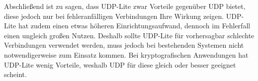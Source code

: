 \documentclass{template}
\begin{document}
Abschließend ist zu sagen, dass UDP-Lite zwar Vorteile gegenüber UDP bietet,
diese jedoch nur bei fehleranfälligen Verbindungen Ihre Wirkung zeigen.
UDP-Lite hat zudem einen etwas höheren Einrichtungsaufwand,
dennoch im Fehlerfall einen ungleich großen Nutzen.
Deshalb sollte UDP-Lite für vorhersagbar schlechte Verbindungen verwendet werden,
muss jedoch bei bestehenden Systemen nicht notwendigerweise zum Einsatz kommen.
Bei kryptografischen Anwendungen hat UDP-Lite wenig Vorteile, weshalb
UDP für diese gleich oder besser geeignet scheint.



%
%
\end{document}

